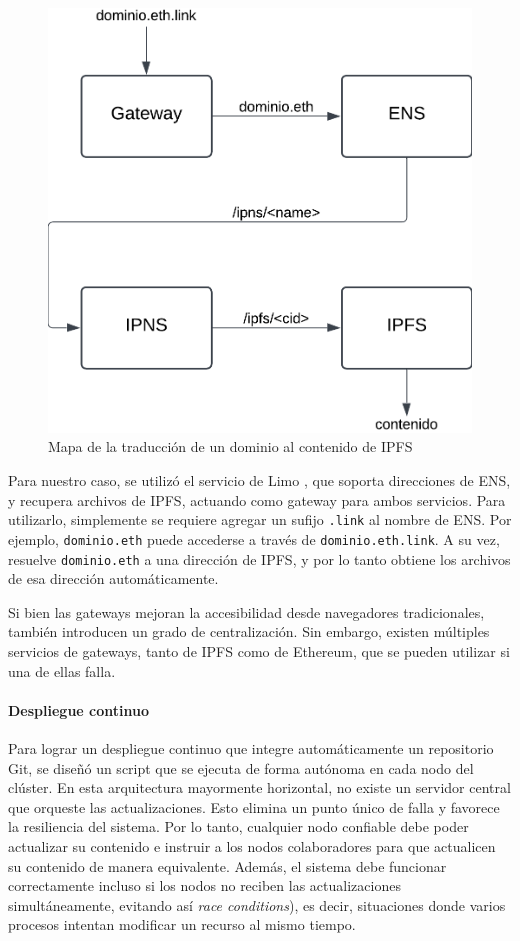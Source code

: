 \begin{figure}[H]
    \centering
    \includegraphics[width=0.5\linewidth]{img/solucion-ipfs/traduccion-dominio.png}
    \caption{Mapa de la traducción de un dominio al contenido de IPFS}
    \label{fig:traduccion-ipfs}
\end{figure}

Para nuestro caso, se utilizó el servicio de Limo \cite{limo}, que soporta direcciones de ENS, y recupera archivos de IPFS, actuando como gateway para ambos servicios. Para utilizarlo, simplemente se requiere agregar un sufijo \texttt{.link} al nombre de ENS. Por ejemplo, \texttt{dominio.eth} puede accederse a través de \texttt{dominio.eth.link}. A su vez, resuelve \texttt{dominio.eth} a una dirección de IPFS, y por lo tanto obtiene los archivos de esa dirección automáticamente.

Si bien las gateways mejoran la accesibilidad desde navegadores tradicionales, también introducen un grado de centralización. Sin embargo, existen múltiples servicios de gateways, tanto de IPFS como de Ethereum, que se pueden utilizar si una de ellas falla.

\paragraph{Despliegue continuo}

Para lograr un despliegue continuo que integre automáticamente un repositorio Git, se diseñó un script que se ejecuta de forma autónoma en cada nodo del clúster. En esta arquitectura mayormente horizontal, no existe un servidor central que orqueste las actualizaciones. Esto elimina un punto único de falla y favorece la resiliencia del sistema. Por lo tanto, cualquier nodo confiable debe poder actualizar su contenido e instruir a los nodos colaboradores para que actualicen su contenido de manera equivalente. Además, el sistema debe funcionar correctamente incluso si los nodos no reciben las actualizaciones simultáneamente, evitando así \textit{race conditions}), es decir, situaciones donde varios procesos intentan modificar un recurso al mismo tiempo.

